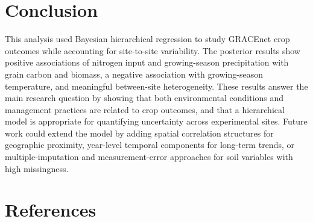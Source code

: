 \documentclass[11pt]{article}
\begin{document}
\section{Conclusion}

This analysis used Bayesian hierarchical regression to study GRACEnet crop outcomes while accounting for site-to-site variability. The posterior results show positive associations of nitrogen input and growing-season precipitation with grain carbon and biomass, a negative association with growing-season temperature, and meaningful between-site heterogeneity. These results answer the main research question by showing that both environmental conditions and management practices are related to crop outcomes, and that a hierarchical model is appropriate for quantifying uncertainty across experimental sites. Future work could extend the model by adding spatial correlation structures for geographic proximity, year-level temporal components for long-term trends, or multiple-imputation and measurement-error approaches for soil variables with high missingness.

\clearpage
\section*{References}
\end{document}
